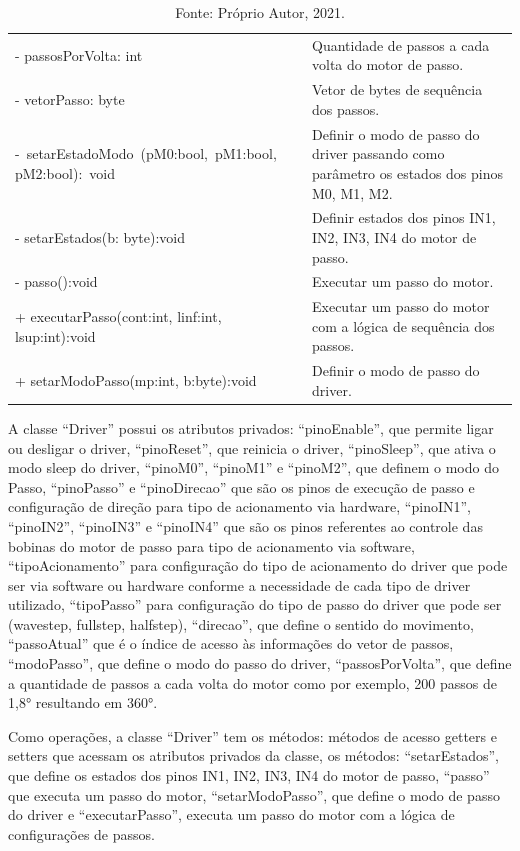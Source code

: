 \begin{table}[H]
\begin{tabular}{p{8cm}p{6cm}}
        - passosPorVolta: int & Quantidade de passos a cada volta do motor de passo.\\
        - vetorPasso: byte & Vetor de bytes de sequência dos passos.\\
        -~setarEstadoModo~(pM0:bool,~pM1:bool, pM2:bool):~void & Definir o modo de passo do driver passando como parâmetro os estados dos pinos M0, M1, M2.\\
        - setarEstados(b: byte):void & Definir estados dos pinos IN1, IN2, IN3, IN4 do motor de passo.\\
        - passo():void & Executar um passo do motor.\\
        + executarPasso(cont:int, linf:int, lsup:int):void & Executar um passo do motor com a lógica de sequência dos passos.\\
        + setarModoPasso(mp:int, b:byte):void & Definir o modo de passo do driver.\\
        \hline       
    \end{tabular}
    \caption*{Fonte: Próprio Autor, 2021.}
    \label{tab:classedriver}
\end{table}

A classe “Driver” possui os atributos privados: “pinoEnable”, que permite ligar ou desligar o driver, 
“pinoReset”, que reinicia o driver, “pinoSleep”, que ativa o modo sleep do driver, “pinoM0”, “pinoM1” 
e “pinoM2”, que definem o modo do Passo, “pinoPasso” e “pinoDirecao” que são os pinos de execução de 
passo e configuração de direção para tipo de acionamento via hardware, “pinoIN1”, “pinoIN2”, “pinoIN3” 
e “pinoIN4” que são os pinos referentes ao controle das bobinas do motor de passo para tipo de acionamento 
via software, “tipoAcionamento” para configuração do tipo de acionamento do driver que pode ser via software 
ou hardware conforme a necessidade de cada tipo de driver utilizado, “tipoPasso” para configuração do tipo 
de passo do driver que pode ser (wavestep, fullstep, halfstep), “direcao”, que define o sentido do movimento, 
“passoAtual” que é o índice de acesso às informações do vetor de passos, “modoPasso”, que define o modo do 
passo do driver, “passosPorVolta”, que define a quantidade de passos a cada volta do motor como por exemplo, 
200 passos de 1,8° resultando em 360°. 

Como operações, a classe “Driver” tem os métodos: métodos de acesso getters e setters que acessam os 
atributos privados da classe, os métodos: “setarEstados”, que define os estados dos pinos IN1, IN2, IN3, 
IN4 do motor de passo, “passo” que executa um passo do motor, “setarModoPasso”, que define o modo de passo 
do driver e “executarPasso”, executa um passo do motor com a lógica de configurações de passos.


